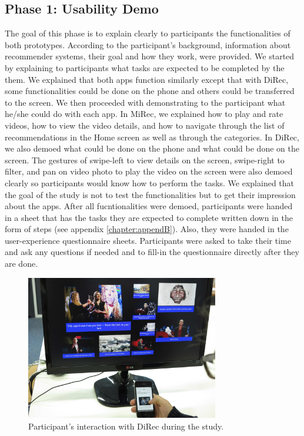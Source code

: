 \subsection{Phase 1: Usability Demo}
The goal of this phase is to explain clearly to participants the functionalities
of both prototypes. According to the participant’s background, information about
recommender systems, their goal and how they work, were provided. We started by
explaining to participants what tasks are expected to be completed by the them.
We explained that both apps function similarly except that with DiRec, some
functionalities could be done on the phone and others could be transferred to
the screen. We then proceeded with demonstrating to the participant what he/she
could do with each app. In MiRec, we explained how to play and rate videos, how
to view the video details, and how to navigate through the list of
recommendations in the Home screen as well as through the categories. In DiRec,
we also demoed what could be done on the phone and what could be done on the
screen. The gestures of swipe-left to view details on the screen, swipe-right to
filter, and pan on video photo to play the video on the screen were also demoed
clearly so participants would know how to perform the tasks. We explained that the goal of
the study is not to test the functionalities but to get their impression about
the apps. After all fucntionalities were demoed, participants were handed in a
sheet that has the tasks they are expected to complete written down in the form
of steps (see appendix \ref{chapter:appendB}). Also, they were handed in the
user-experience questionnaire sheets. Participants were asked to take their time and ask any questions if needed and to fill-in the questionnaire
directly after they are done.
\begin{figure}[t]
\includegraphics[width=0.75\textwidth, center, center]{figures/IMG_6806}
\caption{Participant's interaction with DiRec during the study.}
\label{fig:figure51}
\end{figure}
